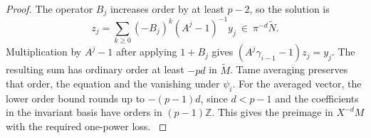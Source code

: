\begin{proof}
The operator \(B_j\) increases order by at least \(p-2\), so the solution is
\[
  z_j=\sum_{k\ge0}(-B_j)^k(A^j-1)^{-1}y_j
                       \ \in\ \pi^{-d}\widetilde N .
\]
Multiplication by \(A^j-1\) after applying \(1+B_j\)
gives \((A^j\gamma_{i-1}-1)z_j=y_j\).
The resulting sum has ordinary order at least \(-pd\) in
\(\widetilde M\). Tame averaging preserves that order, the
equation and the vanishing under \(\psi_i\). For the averaged
vector, the lower order bound rounds up to \(-(p-1)d\), since
\(d<p-1\) and the coefficients in the invariant basis have
orders in \((p-1)\mathbb Z\). This gives the preimage in
\(X^{-d}M\) with the required one-power loss.
\label{cor:residue-frobenius-inverse-1}
\end{proof}

